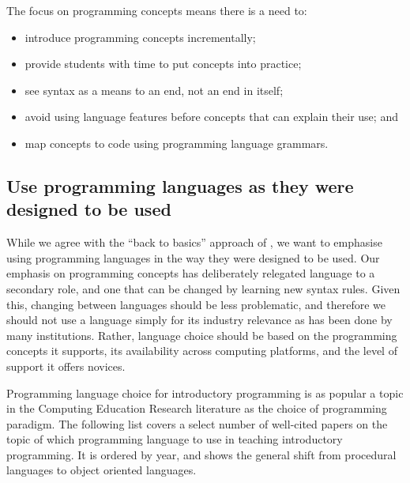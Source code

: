 The focus on programming concepts means there is a need to: %
\begin{itemize}[noitemsep,nolistsep]
	\item introduce programming concepts incrementally;
	\item provide students with time to put concepts into practice;
	\item see syntax as a means to an end, not an end in itself;
	\item avoid using language features before concepts that can explain their use; and
	\item map concepts to code using programming language grammars.
\end{itemize} 


\subsection{Use programming languages as they were designed to be used} %
\label{ssub:use_programming_languages_as_they_were_designed_to_be_used}

While we agree with the ``back to basics'' approach of \citet{Reges:2006}, we want to emphasise using programming languages in the way they were designed to be used. Our emphasis on programming concepts has deliberately relegated language to a secondary role, and one that can be changed by learning new syntax rules. Given this, changing between languages should be less problematic, and therefore we should not use a language simply for its industry relevance as has been done by many institutions. Rather, language choice should be based on the programming concepts it supports, its availability across computing platforms, and the level of support it offers novices.

Programming language choice for introductory programming is as popular a topic in the Computing Education Research literature as the choice of programming paradigm. The following list covers a select number of well-cited papers on the topic of which programming language to use in teaching introductory programming. It is ordered by year, and shows the general shift from procedural languages to object oriented languages.

%
%



